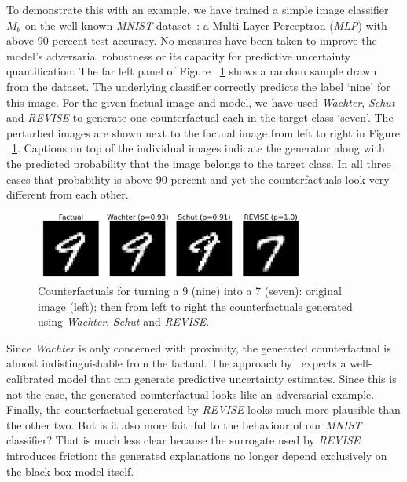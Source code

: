 \documentclass{article}
\begin{document}
To demonstrate this with an example, we have trained a simple image classifier $M_{\theta}$ on the well-known \textit{MNIST} dataset~\citep{lecun1998mnist}: a Multi-Layer Perceptron (\textit{MLP}) with above 90 percent test accuracy. No measures have been taken to improve the model's adversarial robustness or its capacity for predictive uncertainty quantification. The far left panel of Figure ~\ref{fig:motiv} shows a random sample drawn from the dataset. The underlying classifier correctly predicts the label `nine' for this image. For the given factual image and model, we have used \textit{Wachter}, \textit{Schut} and \textit{REVISE} to generate one counterfactual each in the target class `seven'. The perturbed images are shown next to the factual image from left to right in Figure ~\ref{fig:motiv}. Captions on top of the individual images indicate the generator along with the predicted probability that the image belongs to the target class. In all three cases that probability is above 90 percent and yet the counterfactuals look very different from each other.

\begin{figure}
  \centering
  \includegraphics[width=0.8\textwidth]{../artifacts/results/images/mnist_motivation.png}
  \caption{Counterfactuals for turning a 9 (nine) into a 7 (seven): original image (left); then from left to right the counterfactuals generated using \textit{Wachter}, \textit{Schut} and \textit{REVISE}.}\label{fig:motiv}
\end{figure}

Since \textit{Wachter} is only concerned with proximity, the generated counterfactual is almost indistinguishable from the factual. The approach by~\citet{schut2021generating} expects a well-calibrated model that can generate predictive uncertainty estimates. Since this is not the case, the generated counterfactual looks like an adversarial example. Finally, the counterfactual generated by \textit{REVISE} looks much more plausible than the other two. But is it also more faithful to the behaviour of our \textit{MNIST} classifier? That is much less clear because the surrogate used by \textit{REVISE} introduces friction: the generated explanations no longer depend exclusively on the black-box model itself. 
\end{document}
